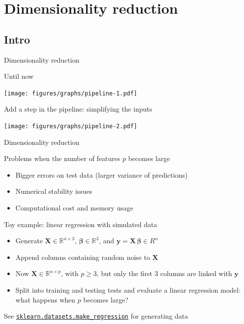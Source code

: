 \documentclass[presentation,mathserif,table]{beamer}
\newcommand{\X}{{\mathbold X}}
\newcommand{\bbeta}{{\mathbold \beta}}
\newcommand{\y}{{\mathbold y}}
\newcommand{\R}{\mathbb{R}}
\begin{document}
\section{Dimensionality reduction}
\label{sec:org75bb3b5}
\subsection{Intro}
\label{sec:org71a6c30}
\begin{frame}[label={sec:orgae1b813}]{Dimensionality reduction}
\begin{block}{Until now}
\begin{center}
\texttt{[image: figures/graphs/pipeline-1.pdf]}
\end{center}
\end{block}
\begin{block}{Add a step in the pipeline: simplifying the inputs}
\begin{center}
\texttt{[image: figures/graphs/pipeline-2.pdf]}
\end{center}
\end{block}
\end{frame}
\begin{frame}[label={sec:org448f247}]{Dimensionality reduction}
\begin{block}{Problems when the number of features \(p\) becomes large}
\begin{itemize}
\item Bigger errors on test data (larger variance of predictions)
\item Numerical stability issues
\item Computational cost and memory usage
\end{itemize}
\end{block}
\end{frame}
\begin{frame}[label={sec:org5bbe0c7},fragile]{Toy example: linear regression with simulated data}
 \begin{itemize}
\item Generate \(\X \in \R^{n \times 3}\), \(\mathbold{\bbeta} \in \R^3\), and \(\y = \X \, \bbeta \in R^n\)
\item Append columns containing random noise to \(\X\)
\item Now \(\X \in \R^{n \times p}\), with \(p \geq 3\), but only the first 3 columns are linked with \(\y\)
\item Split into training and testing tests and evaluate a linear regression model: what happens when \(p\) becomes large?
\end{itemize}
\vfill

See \href{https://scikit-learn.org/stable/modules/generated/sklearn.datasets.make\_regression.html\#sklearn.datasets.make\_regression}{\texttt{sklearn.datasets.make\_regression}} for generating data
\end{frame}
\end{document}
